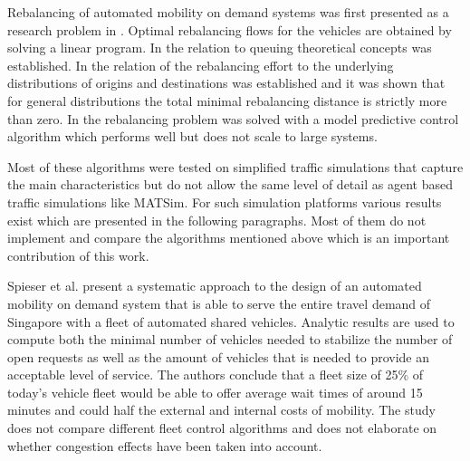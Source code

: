 Rebalancing of automated mobility on demand systems was first presented as a research
 problem in \citep{pavone2011load}. Optimal rebalancing flows for the vehicles are
 obtained by solving a linear program. In \citep{zhang2016control} the relation to
 queuing theoretical concepts was established. In \citep{treleaven2011asymptotically}
 the relation of the rebalancing effort to the underlying distributions of origins
 and destinations was established and it was shown that for general distributions
 the total minimal rebalancing distance is strictly more than zero.
 In   \citep{zhang2016model} the rebalancing problem was solved with a model
 predictive control algorithm which performs well but does not scale to large systems.

Most of these algorithms were tested on simplified traffic simulations that capture
the main characteristics but do not allow the same level of detail as agent based
traffic simulations like MATSim. For such simulation platforms various results
exist which are presented in the following paragraphs. Most of them do not
implement and compare the algorithms mentioned above which is an important
contribution of this work.

Spieser et al. \cite{spieser2014toward} present a systematic approach to the
design of an automated mobility on demand system that is able to serve the entire
travel demand of Singapore with a fleet of automated shared vehicles. Analytic
results are used to compute both the minimal number of vehicles needed to stabilize
the number of open requests as well as the amount of vehicles that is needed to
provide an acceptable level of service. The authors conclude that a fleet size
of 25\% of today's vehicle fleet would be able to offer average wait times of
around 15 minutes and could half the external and internal costs of mobility.
The study does not compare different fleet control algorithms and does not
elaborate on whether congestion effects have been taken into account.

